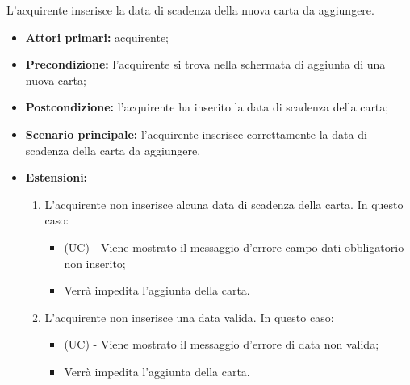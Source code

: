 L'acquirente inserisce la data di scadenza della nuova carta da aggiungere.
\begin{itemize}
    \item \textbf{Attori primari:} acquirente;
    \item \textbf{Precondizione:} l'acquirente si trova nella schermata di aggiunta di una nuova carta;
    \item \textbf{Postcondizione:} l'acquirente ha inserito la data di scadenza della carta;
    \item \textbf{Scenario principale:} l'acquirente inserisce correttamente la data di scadenza della carta da aggiungere.
    \item \textbf{Estensioni:}
    \begin{enumerate}[label=\lett]
        \item L'acquirente non inserisce alcuna data di scadenza della carta. In questo caso:
        \begin{itemize}
            \item (UC) - Viene mostrato il messaggio d'errore campo dati obbligatorio non inserito;
            \item Verrà impedita l'aggiunta della carta.
        \end{itemize}
        \item L'acquirente non inserisce una data valida. In questo caso:
        \begin{itemize}
            \item (UC) - Viene mostrato il messaggio d'errore di data non valida;
            \item Verrà impedita l'aggiunta della carta.
        \end{itemize}
    \end{enumerate}
\end{itemize}


